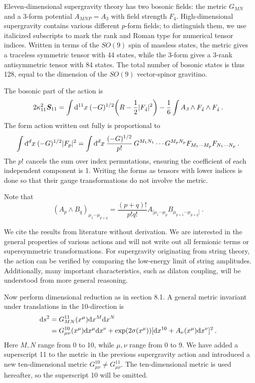 Eleven-dimensional supergravity theory has two bosonic fields: the metric $G_{MN}$ and a 3-form potential $A_{MNP}=A_{\textit{3}}$ with field strength $F_{\textit{4}}$. High-dimensional supergravity contains various different $p$-form fields; to distinguish them, we use italicized subscripts to mark the rank and Roman type for numerical tensor indices. Written in terms of the $SO(9)$ spin of massless states, the metric gives a traceless symmetric tensor with 44 states, while the 3-form gives a 3-rank antisymmetric tensor with 84 states. The total number of bosonic states is thus 128, equal to the dimension of the $SO(9)$ vector-spinor gravitino.

The bosonic part of the action is
\begin{equation}
	2\kappa_{11}^{2}\bm{S}_{11}=\int\mathrm{d}^{11}x\:(-G)^{1/2}\biggl(R-\frac{1}{2}\lvert F_{\textit{4}}\rvert^{2}\biggr)-\frac{1}{6}\int A_{\textit{3}}\wedge F_{\textit{4}}\wedge F_{\textit{4}} \:. \label{12.1.1}
\end{equation}
The form action written out fully is proportional to
\begin{equation}
	\int\mathrm{d}^{d}x\:(-G)^{1/2}\lvert F_{p}\rvert^{2} = \int \mathrm{d}^{d}x\:\frac{(-G)^{1/2}}{p!}\,G^{M_{1}N_{1}}\cdots G^{M_{p}N_{p}}F_{M_{1}\cdots M_{p}}F_{N_{1}\cdots N_{p}} \:. \label{12.1.2}
\end{equation}
The $p!$ cancels the sum over index permutations, ensuring the coefficient of each independent component is 1. Writing the forms as tensors with lower indices is done so that their gauge transformations do not involve the metric.
\begin{tcolorbox}[breakable]
	Note that
	\[(A_{p}\wedge B_{q})_{\mu_{1}\cdots\mu_{p+q}} = \frac{(p+q)!}{p!q!}A_{[\mu_{1}\cdots \mu_{p}}B_{\mu_{p+1}\cdots\mu_{p+q}]} \:.\]
\end{tcolorbox}

We cite the results from literature without derivation. We are interested in the general properties of various actions and will not write out all fermionic terms or supersymmetric transformations. For supergravity originating from string theory, the action can be verified by comparing the low-energy limit of string amplitudes. Additionally, many important characteristics, such as dilaton coupling, will be understood from more general reasoning.

Now perform dimensional reduction as in section 8.1. A general metric invariant under translations in the 10-direction is
\begin{align}
	\mathrm{d} s^{2} &= G_{MN}^{11}(x^{\mu})\mathrm{d} x^{M}\mathrm{d} x^{N} \nonumber \\
	&= G_{\mu\nu}^{10}(x^{\mu})\mathrm{d} x^{\mu}\mathrm{d} x^{\nu} + \exp(2\sigma(x^{\mu}))[\mathrm{d} x^{10}+A_{\nu}(x^{\mu})\mathrm{d} x^{\nu}]^{2} \:. \label{12.1.3}
\end{align}
Here $M,N$ range from 0 to 10, while $\mu,\nu$ range from 0 to 9. We have added a superscript 11 to the metric in the previous supergravity action and introduced a new ten-dimensional metric $G_{\mu\nu}^{10}\neq G_{\mu\nu}^{11}$. The ten-dimensional metric is used hereafter, so the superscript 10 will be omitted.

